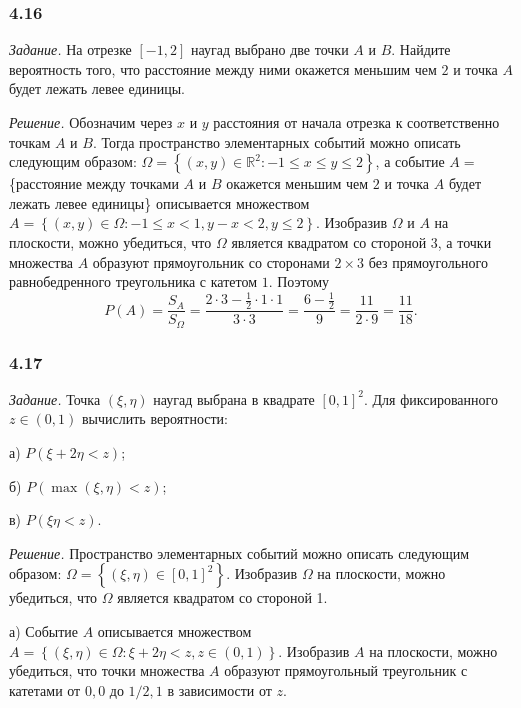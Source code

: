 \documentclass{book}
\begin{document}
\subsubsection*{4.16}

\textit{Задание.} На отрезке $ \left[ -1, 2 \right] $ наугад выбрано две точки $A$ и $B$.
Найдите вероятность того, что расстояние между ними окажется меньшим чем $2$ и точка $A$ будет лежать левее единицы.

\textit{Решение.} Обозначим через $x$ и $y$ расстояния от начала отрезка к соответственно точкам $A$ и $B$.
Тогда пространство элементарных событий можно описать следующим образом:
$ \Omega =
\left\{ \left( x, y \right) \in \mathbb{R}^2: -1 \leq x \leq y \leq 2 \right\}$,
а событие $A = $ \{расстояние между точками $A$ и $B$ окажется меньшим чем $2$ и точка $A$ будет лежать левее единицы\}
описывается множеством $A = \left\{ \left( x, y \right) \in \Omega: -1 \leq x < 1, y - x < 2, y \leq 2 \right\}$.
Изобразив $ \Omega $ и $A$ на плоскости, можно убедиться, что $ \Omega $ является квадратом со стороной $3$,
а точки множества $A$ образуют прямоугольник со сторонами $2 \times 3$ без прямоугольного равнобедренного треугольника с катетом $1$.
Поэтому
$$P \left( A \right) =
\frac{S_A}{S_{ \Omega }} =
\frac{2 \cdot 3 - \frac{1}{2} \cdot 1 \cdot 1}{3 \cdot 3} =
\frac{6 - \frac{1}{2} }{9} =
\frac{11}{2 \cdot 9} =
\frac{11}{18}.$$

\subsubsection*{4.17}

\textit{Задание.} Точка $ \left( \xi, \eta \right) $ наугад выбрана в квадрате $ \left[ 0, 1 \right]^2$.
Для фиксированного $z \in \left( 0, 1 \right) $ вычислить вероятности:

а) $P \left( \xi + 2 \eta < z \right) $;

б) $P \left( \max \left( \xi, \eta \right) < z \right) $;

в) $P \left( \xi \eta < z \right) $.

\textit{Решение.} Пространство элементарных событий можно описать следующим образом:
$ \Omega =
\left\{ \left( \xi, \eta \right) \in \left[ 0, 1 \right]^2 \right\}$.
Изобразив $ \Omega $ на плоскости, можно убедиться, что $ \Omega $ является квадратом со стороной 1.

а) Событие $A$ описывается множеством
$A =
\left\{ \left( \xi, \eta \right) \in \Omega:
\xi + 2 \eta < z, z \in \left( 0, 1 \right) \right\}$.
Изобразив $A$ на плоскости, можно убедиться,
что точки множества $A$ образуют прямоугольный треугольник с катетами от $0, 0$ до $1/2, 1$ в зависимости от $z$.
\end{document}

